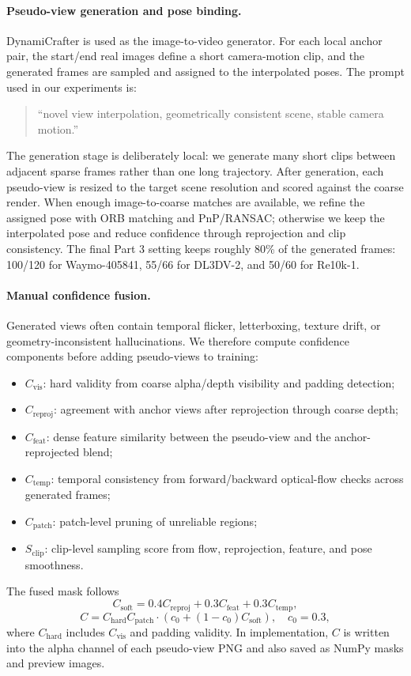\documentclass[10pt,twocolumn,letterpaper]{article}
\begin{document}
\paragraph{Pseudo-view generation and pose binding.}
DynamiCrafter is used as the image-to-video generator.  For each local anchor pair, the start/end real images define a short camera-motion clip, and the generated frames are sampled and assigned to the interpolated poses.  The prompt used in our experiments is:
\begin{quote}
\small ``novel view interpolation, geometrically consistent scene, stable camera motion.''
\end{quote}
The generation stage is deliberately local: we generate many short clips between adjacent sparse frames rather than one long trajectory.  After generation, each pseudo-view is resized to the target scene resolution and scored against the coarse render.  When enough image-to-coarse matches are available, we refine the assigned pose with ORB matching and PnP/RANSAC; otherwise we keep the interpolated pose and reduce confidence through reprojection and clip consistency.  The final Part 3 setting keeps roughly 80\% of the generated frames: 100/120 for Waymo-405841, 55/66 for DL3DV-2, and 50/60 for Re10k-1.

\paragraph{Manual confidence fusion.}
Generated views often contain temporal flicker, letterboxing, texture drift, or geometry-inconsistent hallucinations.  We therefore compute confidence components before adding pseudo-views to training:
\begin{itemize}
  \item $C_{\mathrm{vis}}$: hard validity from coarse alpha/depth visibility and padding detection;
  \item $C_{\mathrm{reproj}}$: agreement with anchor views after reprojection through coarse depth;
  \item $C_{\mathrm{feat}}$: dense feature similarity between the pseudo-view and the anchor-reprojected blend;
  \item $C_{\mathrm{temp}}$: temporal consistency from forward/backward optical-flow checks across generated frames;
  \item $C_{\mathrm{patch}}$: patch-level pruning of unreliable regions;
  \item $S_{\mathrm{clip}}$: clip-level sampling score from flow, reprojection, feature, and pose smoothness.
\end{itemize}
The fused mask follows
\begin{equation}
C_{\mathrm{soft}} =
0.4C_{\mathrm{reproj}} + 0.3C_{\mathrm{feat}} + 0.3C_{\mathrm{temp}},
\end{equation}
\begin{equation}
C =
C_{\mathrm{hard}} C_{\mathrm{patch}} \cdot
\left(c_0 + (1-c_0) C_{\mathrm{soft}}\right),
\quad c_0=0.3,
\end{equation}
where $C_{\mathrm{hard}}$ includes $C_{\mathrm{vis}}$ and padding validity.  In implementation, $C$ is written into the alpha channel of each pseudo-view PNG and also saved as NumPy masks and preview images.
\end{document}
